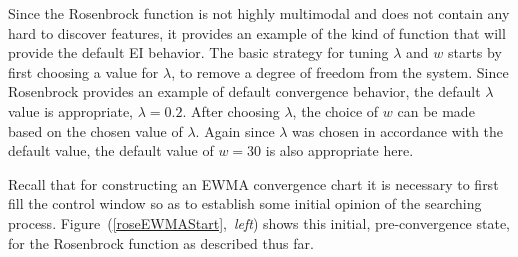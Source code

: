 \documentclass[12pt]{article}
\begin{document}
	
	Since the Rosenbrock function is not highly multimodal and does not contain any hard to discover features, it provides an example of the kind of function that will provide the default EI behavior.  
	The basic strategy for tuning $\lambda$ and $w$ starts by first choosing a value for $\lambda$, to remove a degree of freedom from the system. %
	Since Rosenbrock provides an example of default convergence behavior, the default $\lambda$ value is appropriate, $\lambda=0.2$.
	After choosing $\lambda$, the choice of $w$ can be made based on the chosen value of $\lambda$.
	Again since $\lambda$ was chosen in accordance with the default value, the default value of $w=30$ is also appropriate here.

	Recall that for constructing an EWMA convergence chart it is necessary to first fill the control window so as to establish some initial opinion of the searching process.
	\mbox{Figure (\ref{roseEWMAStart}, {\it left})} shows this initial, pre-convergence state, for the Rosenbrock function as described thus far.
	
\end{document}
